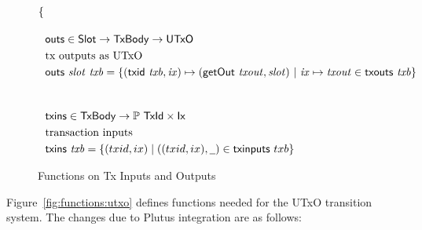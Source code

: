 \begin{figure}[htb]
\begin{align*}
\begin{cases}
            \end{cases}
    \nextdef
    & \fun{outs} \in \Slot \to \TxBody \to \UTxO \\
    & \text{tx outputs as UTxO} \\
    & \fun{outs} ~ \var{slot}~\var{txb} =
        \left\{
          (\fun{txid} ~ \var{txb}, \var{ix}) \mapsto (\fun{getOut}~\var{txout},\var{slot}) ~
          \middle|~
          \var{ix} \mapsto \var{txout} \in \txouts{txb}
        \right\} \\
    \nextdef
    & \fun{txins} \in \TxBody \to \powerset{\TxId \times \Ix} \\
    & \text{transaction inputs} \\
    & \fun{txins} ~\var{txb} = \{(txid,ix) \mid ((txid,ix),\wcard)\in\fun{txinputs} ~txb\} \\
  \end{align*}
  \caption{Functions on Tx Inputs and Outputs}
  \label{fig:functions:insouts}
\end{figure}


Figure~\ref{fig:functions:utxo} defines functions needed for the UTxO transition system.
The changes due to Plutus integration are as follows:

